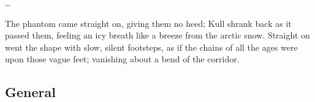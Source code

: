 \begin{changes}
\begin{itemize}
{          \ldots 
          
          The phantom came straight on, giving them no heed; Kull shrank back as it passed them, feeling an icy breath like a breeze from the arctic snow.
          Straight on went the shape with slow, silent footsteps, as if the chains of all the ages were upon those vague feet; vanishing about a bend of the corridor.
        }
    \end{itemize}
\end{changes}










\subsection{General}
